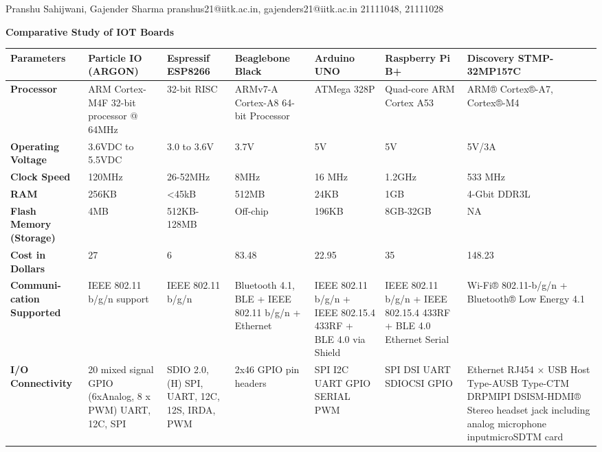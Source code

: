 \documentclass[a4paper,11pt]{article}
\begin{document}
{Pranshu Sahijwani, Gajender Sharma}                    %
{pranshus21@iitk.ac.in, gajenders21@iitk.ac.in}      %
{21111048, 21111028}          %


\begin{iotsolution}


\begin{center}
\caption{\textbf{Comparative Study of IOT Boards}} \label{tab:title} 
\begin{longtable}{|p{2.2cm}|p{1.5cm}|p{1.5cm}|p{2.2cm}|p{2cm}|p{2cm}|p{2cm}|} 

 \hline
 \textbf{Parameters} & Particle IO \cite{compstudy} (ARGON)& Espressif ESP8266 \cite{compstudy, are} & Beaglebone Black  \cite{bb, bb1} & Arduino UNO \cite{are, compstudy} & Raspberry Pi B+ \cite{are, compstudy}  & Discovery STMP-32MP157C \cite{stmp, top21}\\ [0.5ex] 
 \hline\hline
 \textbf{Processor} & 
ARM Cortex-M4F 32-bit processor @ 64MHz & 32-bit RISC & ARMv7-A Cortex-A8 
64-bit Processor & ATMega 328P & Quad-core ARM Cortex A53 & ARM® Cortex®-A7, Cortex®-M4 \\ 
 \hline
  \textbf{Operating Voltage} & 3.6VDC to 5.5VDC & 3.0 to 3.6V & 3.7V & 5V & 5V & 5V/3A \\
 \hline
  \textbf{Clock Speed} & 120MHz & 26-52MHz & 8MHz & 16 MHz & 1.2GHz & 533 MHz\\
 \hline
  \textbf{RAM} & 256KB & <45kB & 512MB & 24KB & 1GB & 4-Gbit DDR3L\\
 \hline
   \textbf{Flash Memory (Storage)} & 4MB & 512KB-128MB & Off-chip  & 196KB & 8GB-32GB & NA\\
 \hline
\textbf{Cost in Dollars} & 27 & 6 & 83.48 & 22.95 & 35 & 148.23\\
 \hline

\textbf{Communi-cation Supported} & IEEE 802.11 b/g/n support & IEEE 802.11 b/g/n &Bluetooth 4.1, BLE + IEEE 802.11 b/g/n + Ethernet& IEEE 802.11 b/g/n + IEEE 
802.15.4 433RF + BLE 4.0 via 
Shield & IEEE 802.11 b/g/n + IEEE 802.15.4 
433RF + BLE 4.0 Ethernet Serial & Wi-Fi® 802.11-b/g/n + Bluetooth® Low Energy 4.1\\
 \hline

\textbf{I/O Connectivity} & 20 mixed signal GPIO (6xAnalog, 8 x PWM) UART, 12C, SPI & SDIO 2.0, (H) SPI, UART, 12C, 12S, IRDA, PWM & 2x46 GPIO pin headers &SPI I2C UART GPIO SERIAL PWM& SPI DSI UART SDIOCSI GPIO & Ethernet RJ454 × USB Host Type-AUSB Type-CTM DRPMIPI DSISM-HDMI® Stereo headset jack including analog microphone inputmicroSDTM card\\
 \hline


\end{longtable}
\end{center}
\end{iotsolution}
\end{document}
